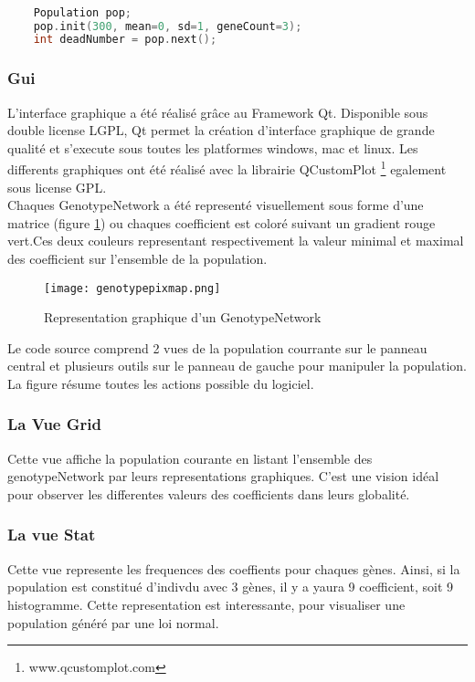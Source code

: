\documentclass{article}
\begin{document}
	\begin{lstlisting}[language=C++, caption=Generation d'une population et basculement vers la génération suivante, label={code3}]

	Population pop;
	pop.init(300, mean=0, sd=1, geneCount=3); 
	int deadNumber = pop.next();

	\end{lstlisting}

	\subsubsection {Gui}
	L'interface graphique a été réalisé grâce au Framework Qt. Disponible sous double license LGPL, Qt permet la création d'interface graphique de grande qualité et s'execute sous toutes les platformes windows, mac et linux. Les differents graphiques ont été réalisé avec la librairie QCustomPlot \footnote{www.qcustomplot.com} egalement sous license GPL. \\
	Chaques GenotypeNetwork a été representé visuellement sous forme d'une matrice (figure \ref{figure2}) ou chaques coefficient est coloré suivant un gradient rouge vert.Ces deux couleurs representant respectivement la valeur minimal et maximal des coefficient sur l'ensemble de la population.

	\begin{figure}[h]
	\label{figure2}
	\caption[test]{Representation graphique d'un GenotypeNetwork }
	\centering
	\texttt{[image: genotypepixmap.png]}
	\end{figure}


	\clearpage
	Le code source comprend 2 vues de la population courrante sur le panneau central et plusieurs outils sur le panneau de gauche pour manipuler la population. La figure résume toutes les actions possible du logiciel.
	\subsubsection {La Vue Grid}
	Cette vue affiche la population courante en listant l'ensemble des genotypeNetwork par leurs representations graphiques. C'est une vision idéal pour observer les differentes valeurs des coefficients dans leurs globalité. 
	\subsubsection { La vue Stat}
	Cette vue represente les frequences des coeffients pour chaques gènes. Ainsi, si la population est constitué d'indivdu avec 3 gènes, il y a yaura 9 coefficient, soit 9 histogramme. Cette representation est interessante, pour visualiser une population généré par une loi normal.
\end{document}
